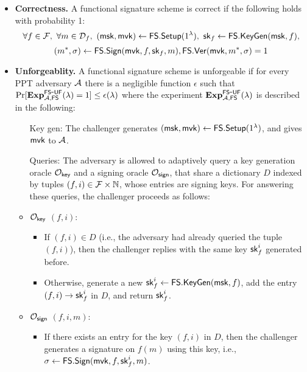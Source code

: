 \documentclass[11pt]{llncs}
\begin{document}
\begin{itemize}

\item \textbf{Correctness.} A functional signature scheme is correct if the following 
holds with probability 1:
$$\forall f \in {\cal F}, \ \forall m \in  {\cal D}_f, \ ({\sf msk}, {\sf mvk}) \gets {\sf FS.Setup}(1^\lambda), \  {\sf sk}_f  \gets {\sf FS.KeyGen}({\sf msk}, f), $$
$$  (m^*,\sigma) \gets  {\sf FS.Sign}({\sf mvk}, f,  {\sf sk}_f, m), {\sf FS.Ver}({\sf mvk}, m^*, \sigma) = 1 $$



\item \textbf{Unforgeablity.} A functional signature scheme is unforgeable if for 
every PPT adversary ${\cal A}$ there is a negligible function $\epsilon$ such that 
$\Pr[\mathbf{Exp}^{\sf FS\mbox{-}UF}_{{\cal A}, {\sf FS}}(\lambda) = 1] \leq \epsilon(\lambda)$ where the experiment 
$\mathbf{Exp}^{\sf FS\mbox{-}UF}_{{\cal A}, {\sf FS}}(\lambda)$ is described in the following:\\

\begin{itemize}

\item[{ Key gen:}] The challenger generates $({\sf msk}, {\sf mvk}) \gets  {\sf FS.Setup}(1^\lambda)$,
and gives ${\sf mvk}$ to ${\cal A}$.

\item[{ Queries:}] The adversary is allowed to adaptively query a key generation oracle $\cal O_{\mathsf{key}}$
and a signing oracle $\cal O_{\mathsf{sign}}$, that share a dictionary $D$ indexed by tuples $(f, i) \in {\cal F} \times \mathbb{N}$,
whose entries are signing keys. For answering these queries, the challenger proceeds as follows:

\item $\cal O_{\mathsf{key}}$ $(f, i)$:

\begin{itemize}

\item If $(f, i) \in D$ (i.e., the adversary had already
queried the tuple $(f,i)$), then the challenger replies with the same
key ${\sf sk}_f^i$ generated before.

\item Otherwise, generate a new ${\sf sk}_f^i \gets {\sf FS.KeyGen}({\sf msk},f)$, add the entry 
$(f,i) \to {\sf sk}_f^i$ in $D$, and return ${\sf sk}_f^i$.
 
\end{itemize}

\item $\cal O_{\mathsf{sign}}$ $(f, i,m)$: 
\begin{itemize}
\item If there exists an entry for the key $(f, i)$ in $D$, then the challenger
generates a signature on $f(m)$ using this key, i.e., 
$\sigma \gets {\sf FS.Sign}({\sf mvk}, f, {\sf sk}_f^i, m)$.


\end{itemize}
\end{itemize}
\end{itemize}
\end{document}
